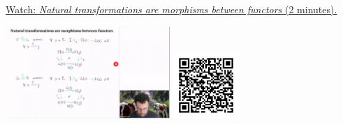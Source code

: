 
\begin{minipage}{10cm}
    \href{https://act4e-spring21.netlify.app/videos/spring2021-nat-trafos:natural-trafos:nattrafos-as-mor.html}{Watch: \emph{Natural transformations are morphisms between functors} (2 minutes).}
        
    \href{https://act4e-spring21.netlify.app/videos/spring2021-nat-trafos:natural-trafos:nattrafos-as-mor.html}{\includegraphics[height=3.5cm]{spring2021-nat-trafos:natural-trafos:nattrafos-as-mor/thumbnails.jpg}}
    \href{https://act4e-spring21.netlify.app/videos/spring2021-nat-trafos:natural-trafos:nattrafos-as-mor.html}{\includegraphics[height=2.5cm]{spring2021-nat-trafos:natural-trafos:nattrafos-as-mor/qrcode.png}}
\end{minipage}
